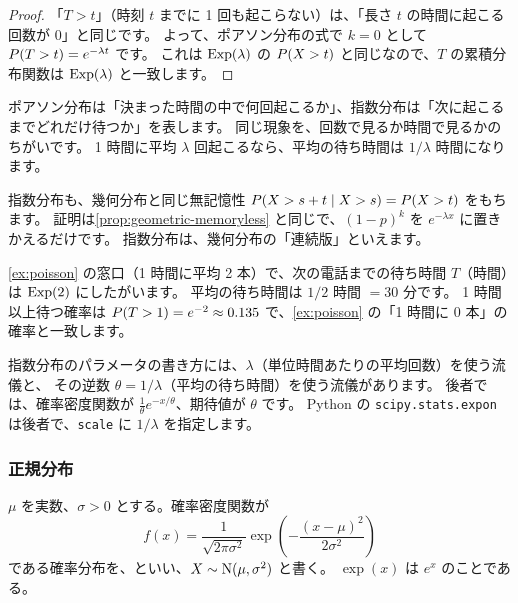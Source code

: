 \begin{proof}
  「$T > t$」（時刻 $t$ までに 1 回も起こらない）は、「長さ $t$ の時間に起こる回数が $0$」と同じです。
  よって、ポアソン分布の式で $k = 0$ として $P(T > t) = e^{-\lambda t}$ です。
  これは $\mathrm{Exp}(\lambda)$ の $P(X > t)$ と同じなので、$T$ の累積分布関数は $\mathrm{Exp}(\lambda)$ と一致します。
\end{proof}

\begin{intuition}
  ポアソン分布は「決まった時間の中で何回起こるか」、指数分布は「次に起こるまでどれだけ待つか」を表します。
  同じ現象を、回数で見るか時間で見るかのちがいです。
  1 時間に平均 $\lambda$ 回起こるなら、平均の待ち時間は $1/\lambda$ 時間になります。
\end{intuition}

指数分布も、幾何分布と同じ無記憶性 $P(X > s + t \mid X > s) = P(X > t)$ をもちます。
証明は\cref{prop:geometric-memoryless} と同じで、$(1-p)^k$ を $e^{-\lambda x}$ に置きかえるだけです。
指数分布は、幾何分布の「連続版」といえます。

\begin{example}[電話の待ち時間][ex:exponential]
  \cref{ex:poisson} の窓口（1 時間に平均 2 本）で、次の電話までの待ち時間 $T$（時間）は $\mathrm{Exp}(2)$ にしたがいます。
  平均の待ち時間は $1/2$ 時間 $= 30$ 分です。
  1 時間以上待つ確率は $P(T > 1) = e^{-2} \approx 0.135$ で、\cref{ex:poisson} の「1 時間に 0 本」の確率と一致します。
\end{example}

\begin{exampoint}
  指数分布のパラメータの書き方には、$\lambda$（単位時間あたりの平均回数）を使う流儀と、
  その逆数 $\theta = 1/\lambda$（平均の待ち時間）を使う流儀があります。
  後者では、確率密度関数が $\frac{1}{\theta} e^{-x/\theta}$、期待値が $\theta$ です。
  Python の \texttt{scipy.stats.expon} は後者で、\texttt{scale} に $1/\lambda$ を指定します。
\end{exampoint}

\subsubsection*{正規分布}

\begin{definition}
  $\mu$ を実数、$\sigma > 0$ とする。確率密度関数が
  \[
    f(x) = \frac{1}{\sqrt{2\pi\sigma^2}} \exp\left(-\frac{(x - \mu)^2}{2\sigma^2}\right)
  \]
  である確率分布を、といい、$X \sim \mathrm{N}(\mu, \sigma^2)$ と書く。
  $\exp(x)$ は $e^x$ のことである。
\end{definition}

